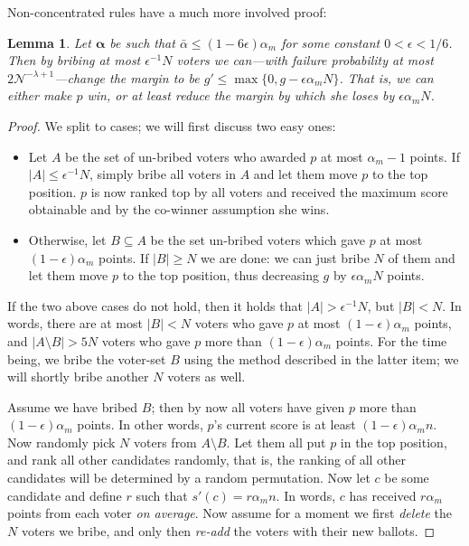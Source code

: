 \documentclass[letterpaper]{article} %
\newtheorem{lemma}[theorem]{Lemma}
\theoremstyle{definition}
\newcommand{\abs}[1]{\lvert #1 \rvert}
\newcommand{\NN}{\mathcal{N}}
\newcommand\vecgreek{\bm}
\newcommand{\veca}{\vecgreek{\alpha}}
\begin{document}
Non-concentrated rules have a much more involved proof:
\begin{lemma}\label{lem:how-to-bribe}
	Let $\veca$ be such that $\bar{\alpha} \leq (1-6\epsilon) \alpha_m$ for some constant $0 < \epsilon < 1/6$.
	 Then by bribing at most $\epsilon^{-1}N$ voters we can---with failure probability at most $2\NN^{-\lambda+1}$---change the margin to be $g' \leq \max\{0, g - \epsilon \alpha_m N\}$. That is, we can either make $p$ win, or at least reduce the margin by which she loses by $\epsilon \alpha_m N$.
\end{lemma}
\begin{proof}	We split to cases; we will first discuss two easy ones: 
	\begin{itemize}
		\item Let $A$ be the set of un-bribed voters who awarded $p$ at most $\alpha_m -1$ points. If $\abs{A} \leq \epsilon^{-1}N$, simply bribe all voters in $A$ and let them move $p$ to the top position. $p$ is now ranked top by all voters and received the maximum score obtainable and by the co-winner assumption she wins.
		
		\item Otherwise, let $B \subseteq A$ be the set un-bribed voters which gave $p$ at most $(1-\epsilon) \alpha_m$ points. If $\abs{B} \geq N$ we are done: we can just bribe $N$ of them and let them move $p$ to the top position, thus decreasing $g$ by $\epsilon \alpha_m N$ points.	 
	\end{itemize} 
	If the two above cases do not hold, then it holds that $\abs{A} > \epsilon^{-1}N$, but $\abs{B} < N$. In words, there are at most $\abs{B} < N$ voters who gave $p$ at most $(1-\epsilon) \alpha_m$ points, and $\abs{A \setminus B} > 5N$ voters who gave $p$ more than $(1-\epsilon) \alpha_m$ points. For the time being, we bribe the voter-set $B$ using the method described in the latter item; we will shortly bribe another $N$ voters as well.
	
	Assume we have bribed $B$; then by now all voters have given $p$ more than $(1-\epsilon) \alpha_m$ points. In other words, $p$'s current score is at least $(1-\epsilon) \alpha_m n$.
	Now randomly pick $N$  voters from $A\setminus B$. Let them all put $p$ in the top position, and rank all other candidates randomly, that is, the ranking of all other candidates will be determined by a random permutation. Now let $c$ be some candidate and define $r$ such that $s'(c)=r \alpha_m n$. In words, $c$ has received $r\alpha_m$ points from each voter \emph{on average}. Now assume for a moment we first \emph{delete} the $N$ voters we bribe, and only then \emph{re-add} the voters with their new ballots.
	

\end{proof}
\end{document}
